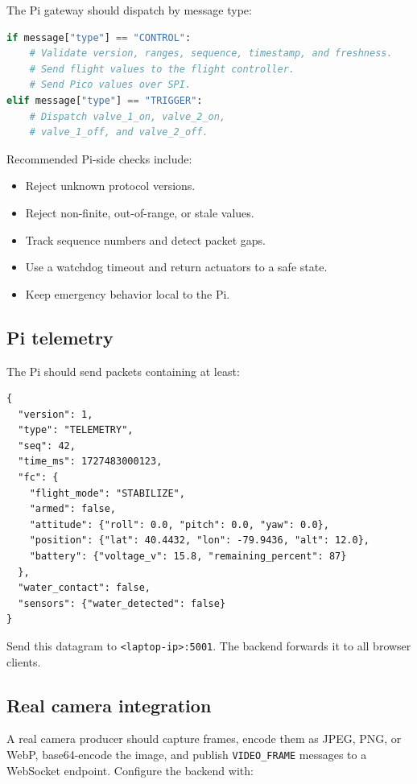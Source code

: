 \documentclass[11pt]{article}
\begin{document}
The Pi gateway should dispatch by message type:

\begin{lstlisting}[language=Python]
if message["type"] == "CONTROL":
    # Validate version, ranges, sequence, timestamp, and freshness.
    # Send flight values to the flight controller.
    # Send Pico values over SPI.
elif message["type"] == "TRIGGER":
    # Dispatch valve_1_on, valve_2_on,
    # valve_1_off, and valve_2_off.
\end{lstlisting}

Recommended Pi-side checks include:

\begin{itemize}
\item Reject unknown protocol versions.
\item Reject non-finite, out-of-range, or stale values.
\item Track sequence numbers and detect packet gaps.
\item Use a watchdog timeout and return actuators to a safe state.
\item Keep emergency behavior local to the Pi.
\end{itemize}

\subsection{Pi telemetry}

The Pi should send packets containing at least:

\begin{lstlisting}
{
  "version": 1,
  "type": "TELEMETRY",
  "seq": 42,
  "time_ms": 1727483000123,
  "fc": {
    "flight_mode": "STABILIZE",
    "armed": false,
    "attitude": {"roll": 0.0, "pitch": 0.0, "yaw": 0.0},
    "position": {"lat": 40.4432, "lon": -79.9436, "alt": 12.0},
    "battery": {"voltage_v": 15.8, "remaining_percent": 87}
  },
  "water_contact": false,
  "sensors": {"water_detected": false}
}
\end{lstlisting}

Send this datagram to \texttt{<laptop-ip>:5001}. The backend forwards it to
all browser clients.

\subsection{Real camera integration}

A real camera producer should capture frames, encode them as JPEG, PNG, or
WebP, base64-encode the image, and publish \texttt{VIDEO\_FRAME} messages to a
WebSocket endpoint. Configure the backend with:
\end{document}
